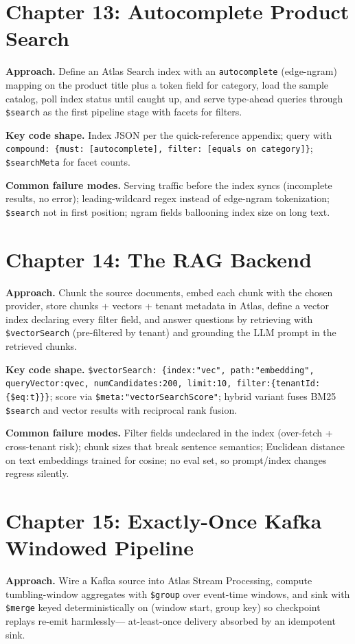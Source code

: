 \section{Chapter 13: Autocomplete Product Search}
\textbf{Approach.} Define an Atlas Search index with an \texttt{autocomplete} (edge-ngram)
mapping on the product title plus a token field for category, load the sample catalog, poll index
status until caught up, and serve type-ahead queries through \texttt{\$search} as the first
pipeline stage with facets for filters.

\textbf{Key code shape.} Index JSON per the quick-reference appendix; query with
\texttt{compound: \{must: [autocomplete], filter: [equals on category]\}}; \texttt{\$searchMeta}
for facet counts.

\textbf{Common failure modes.} Serving traffic before the index syncs (incomplete results, no
error); leading-wildcard regex instead of edge-ngram tokenization; \texttt{\$search} not in first
position; ngram fields ballooning index size on long text.

\section{Chapter 14: The RAG Backend}
\textbf{Approach.} Chunk the source documents, embed each chunk with the chosen provider, store
chunks + vectors + tenant metadata in Atlas, define a vector index declaring every filter field,
and answer questions by retrieving with \texttt{\$vectorSearch} (pre-filtered by tenant) and
grounding the LLM prompt in the retrieved chunks.

\textbf{Key code shape.} \texttt{\$vectorSearch: \{index:"vec", path:"embedding",
queryVector:qvec, numCandidates:200, limit:10, filter:\{tenantId:\{\$eq:t\}\}\}}; score via
\texttt{\$meta:"vectorSearchScore"}; hybrid variant fuses BM25 \texttt{\$search} and vector
results with reciprocal rank fusion.

\textbf{Common failure modes.} Filter fields undeclared in the index (over-fetch + cross-tenant
risk); chunk sizes that break sentence semantics; Euclidean distance on text embeddings trained
for cosine; no eval set, so prompt/index changes regress silently.

\section{Chapter 15: Exactly-Once Kafka Windowed Pipeline}
\textbf{Approach.} Wire a Kafka source into Atlas Stream Processing, compute tumbling-window
aggregates with \texttt{\$group} over event-time windows, and sink with \texttt{\$merge} keyed
deterministically on (window start, group key) so checkpoint replays re-emit harmlessly---
at-least-once delivery absorbed by an idempotent sink.

